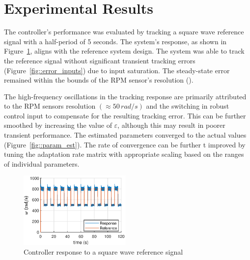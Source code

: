 \section{Experimental Results}
The controller's performance was evaluated by tracking a square wave reference signal with a half-period of 5 seconds. The system's response, as shown in Figure~\ref{fig::response}, aligns with the reference system design. The system was able to track the reference signal without significant transient tracking errors (Figure~\ref{fig::error_inputs}) due to input saturation. The steady-state error remained within the bounds of the RPM sensor's resolution (\cite{seshaIdent}).

The high-frequency oscillations in the tracking response are primarily
attributed to the RPM sensors resolution $(\approx 50 \, rad/s)$ and the
switching in robust control input to compensate for the resulting tracking
error. This can be further smoothed by increasing the value of $\varepsilon$,
although this may result in poorer transient performance. The estimated
parameters converged to the actual values (Figure~\ref{fig::param_est}). The
rate of convergence can be further t improved by tuning the adaptation rate
matrix with appropriate scaling based on the ranges of individual parameters.

\begin{figure}[H]
    \centering
    \includegraphics[width = 0.49\textwidth]{Part2/figs/4_figs/results/response.eps}
    \caption{Controller response to a square wave reference signal}
    \label{fig::response}
\end{figure}

